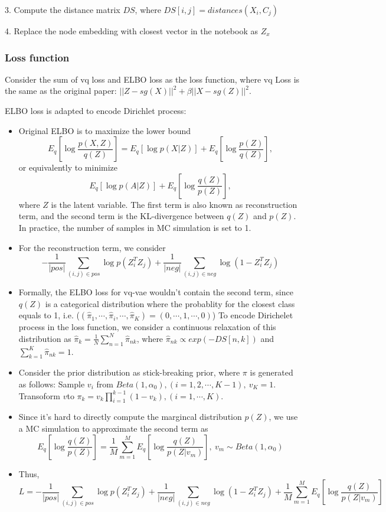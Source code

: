 \documentclass[12pt]{amsart}
\begin{document}
3. Compute the distance matrix $DS$, where $DS[i,j] = distances(X_i, C_j)$  

4. Replace the node embedding with closest vector in the notebook as $Z_x$

\subsubsection{Loss function}
\hfill

Consider the sum of vq loss and ELBO loss as the loss function, where vq Loss is the same as the original paper: $||Z-sg(X)||^2 + \beta ||X-sg(Z)||^2$.

ELBO loss is adapted to encode Dirichlet process: 
\begin{itemize}
    \item
    Original ELBO is to maximize the lower bound 
    \[E_q[ \log \frac{ p(X,Z) }{ q(Z) } ] = E_q[\log p(X|Z)] + E_q[ \log \frac{ p(Z) }{ q(Z) }],\]
    or equivalently to minimize
    \[ E_q[\log p(A|Z)]  + E_q[\log \frac{ q(Z) }{ p(Z) }],\]
    where $Z$ is the latent variable. The first term is also known as reconstruction term, and the second term is the KL-divergence between $q(Z)$ and $p(Z)$.
    In practice, the number of samples in MC simulation is set to 1.

    \item For the reconstruction term, we consider 
    \[ -\frac{1}{|pos|} \sum_{(i,j) \in pos} \log p(Z_{i}^T Z_{j})+ \frac{1}{|neg|}\sum_{(i,j) \in neg} \log(1-Z_i^T Z_j) \]

    \item 
    Formally, the ELBO loss for vq-vae wouldn't contain the second term, 
    since $q(Z)$ is a categorical distribution where the probablity for 
    the closest class equals to 1, i.e. ($(\hat{\pi}_1, \cdots, \hat{\pi}_i, \cdots, \hat{\pi}_K) = (0, \cdots, 1, \cdots, 0)$)
    To encode Dirichelet process in the loss function, we consider a continuous relaxation of this distribution as 
    $\hat{\pi}_k = \frac{1}{N}\sum_{n=1}^{N} \hat{\pi}_{nk}$, where $\hat{\pi}_{nk} \propto exp(-DS[n,k])$ and $\sum_{k=1}^{K}{\hat{\pi}_{nk}}=1$.
    \item 
    Consider the prior distribution as stick-breaking prior, where $\pi$ is generated as follows:
    \subitem Sample $v_i$ from $Beta(1, \alpha_0), (i=1, 2, \cdots, K-1), \ v_K = 1$.
    \subitem Transoform $v $to $\pi_k = v_k \prod_{i=1}^{k-1}(1-v_{k}), (i=1, \cdots, K).$
    \item Since it's hard to directly compute the margincal distribution $p(Z)$,
    we use a MC simulation to approximate the second term as 
    \[ E_q[\log \frac{q(Z)}{p(Z)}] = \frac{1}{M} \sum_{m=1}^M E_q[\log \frac{q(Z)}{p(Z|v_m)} ], \ v_m \sim Beta(1,\alpha_0) \]
    \item 
    Thus,
    \[  L = - \frac{1}{|pos|} \sum_{(i,j) \in pos} \log p(Z_{i}^T Z_{j}) 
    + \frac{1}{|neg|}\sum_{(i,j) \in neg} \log(1-Z_i^T Z_j) + \frac{1}{M} \sum_{m=1}^M E_q[\log \frac{q(Z)}{p(Z|v_m)}] \]
\end{itemize}
\end{document}
